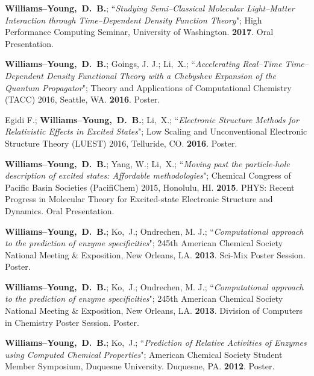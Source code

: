 \documentclass[10pt]{res} %
\newcommand*\me[0]{{\bf Williams--Young,~D.~B.}}
\newcommand*\xsli[0]{Li,~X.}
\newcommand*\ko[0]{Ko,~J.}
\newcommand{\invited}{\item[$*$\theenumi.]}
\begin{document}
\begin{resume}
\vspace{15pt} %
\begin{etaremune}
  \invited \me; 
        ``\emph{Studying Semi--Classical Molecular Light--Matter Interaction through Time--Dependent
	  Density Function Theory}";
	High Performance Computing Seminar, University of Washington.
	\textbf{2017}. Oral Presentation.
  \item \me; Goings, J. J.; \xsli;
        ``\emph{Accelerating Real--Time Time--Dependent Density Functional Theory with a Chebyshev 
	  Expansion of the Quantum Propagator}";
	Theory and Applications of Computational Chemistry (TACC) 2016, Seattle, WA.
	\textbf{2016}. Poster.
  \item Egidi F.; \me; \xsli;
        ``\emph{Electronic Structure Methods for Relativistic Effects in Excited States}";
	Low Scaling and Unconventional Electronic Structure Theory (LUEST) 2016, Telluride, CO.
	\textbf{2016}. Poster.
  \item \me; Yang, W.; \xsli;
        ``\emph{Moving past the particle-hole description of excited states: Affordable methodologies}";
	Chemical Congress of Pacific Basin Societies (PacifiChem) 2015, Honolulu, HI.
	\textbf{2015}. 
	PHYS: Recent Progress in Molecular Theory for Excited-state Electronic Structure and
	Dynamics. Oral Presentation.
  \item \me; \ko; Ondrechen, M. J.;
	``\emph{Computational approach to the prediction of enzyme specificities}";
	245th American Chemical Society National Meeting \& Exposition, New Orleans, LA.
	\textbf{2013}. Sci-Mix Poster Session. Poster.
  \item \me; \ko; Ondrechen, M. J.;
	``\emph{Computational approach to the prediction of enzyme specificities}";
	245th American Chemical Society National Meeting \& Exposition, New Orleans, LA.
	\textbf{2013}. Division of Computers in Chemistry Poster Session. Poster.
  \item \me; \ko;
	``\emph{Prediction of Relative Activities of Enzymes using Computed Chemical Properties}";
	American Chemical Society Student Member Symposium, Duquesne University. Duquesne, PA.
	\textbf{2012}. Poster.

\end{etaremune}
\end{resume}
\end{document}
